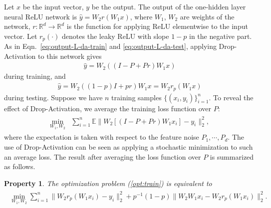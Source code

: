 \documentclass[11pt]{article}
\newtheorem{property}[theorem]{Property}
\begin{document}
Let $x$ be the input vector, $y$ be the output. The output of the one-hidden layer neural ReLU network is $\hat{y} = W_2r(W_1x)$, where $W_1$, $W_2$ are weights of the network, $r:\mathbb{R}^d\rightarrow \mathbb{R}^d$ is the function for applying ReLU elementwise to the input vector. Let $r_p(\cdot)$ denotes the leaky ReLU with slope $1-p$ in the negative part. As in Eqn.~\eqref{eq:output-L-da-train} and \eqref{eq:output-L-da-test}, applying Drop-Activation to this network gives
\begin{align}
\hat{y} = W_2((I-P+Pr)W_1x)
\label{eq:output-train}
\end{align}
during training, and
\begin{align}
\hat{y} = W_2((1-p)I+pr)W_1x = W_2r_p(W_1x)
\label{eq:output-test}
\end{align}
during testing. Suppose we have $n$ training samples $\{(x_i,y_i)\}_{i=1}^n$. To reveal the effect of Drop-Activation, we average the training loss function over $P$:
\begin{align}
\begin{split}
\min\limits_{W_1,W_2}& \sum_{i=1}^n \mathbb{E} \|W_2[(I-P+Pr)W_1x_i] - y_i\|_2^2,
\end{split}
\label{opt:train}
\end{align}
where the expectation is taken with respect to the feature noise $P_1,\cdots,P_d$. The use of Drop-Activation can be seen as applying a stochastic minimization to such an average loss. The result after averaging the loss function over $P$ is summarized as follows.
\begin{property}
	The optimization problem (\ref{opt:train}) is equivalent to
	\begin{align}
	\begin{split}
	\min\limits_{W_1,W_2}\sum_{i=1}^n \|W_2r_p(W_1x_i) - y_i\|_2^2 + p^{-1}(1-p)\|W_2W_1x_i - W_2r_p(W_1x_i)\|_2^2.
	\end{split}
	\label{opt:3}
	\end{align}
	\label{prop1}
	\vspace{-0.5cm}
\end{property}
\end{document}
